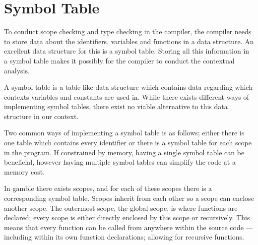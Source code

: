 \section{Symbol Table}
To conduct scope checking and type checking in the compiler, the compiler needs to store data about the identifiers, variables and functions in a data structure.
An excellent data structure for this is a symbol table.
Storing all this information in a symbol table makes it possibly for the compiler to conduct the contextual analysis.

A symbol table is a table like data structure which contains data regarding which contexts variables and constants are used in.
While there exists different ways of implementing symbol tables, there exist no viable alternative to this data structure in our context.

Two common ways of implementing a symbol table is as follows; either there is one table which contains every identifier or there is a symbol table for each scope in the program.
If constrained by memory, having a single symbol table can be beneficial, however having multiple symbol tables can simplify the code at a memory cost. 

In \gls{gamble} there exists scopes, and for each of these scopes there is a corresponding symbol table. 
Scopes inherit from each other so a scope can enclose another scope. 
The outermost scope, the global scope, is where functions are declared; every scope is either directly enclosed by this scope or recursively.
This means that every function can be called from anywhere within the source code --- including within its own function declarations; allowing for recursive functions.

